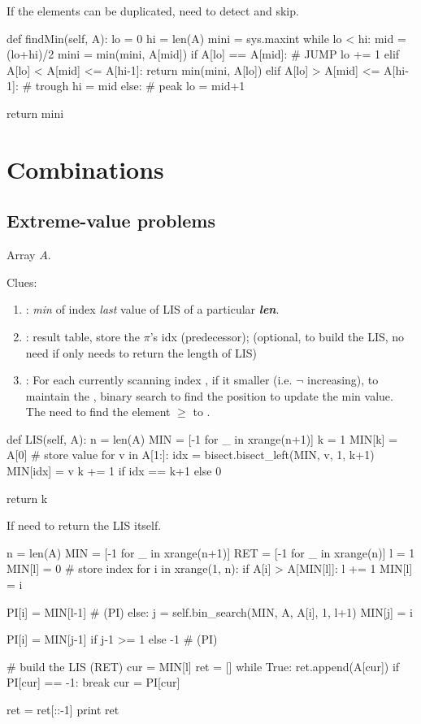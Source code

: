 If the elements can be duplicated, need to detect and skip. 
\begin{python}
def findMin(self, A):
    lo = 0
    hi = len(A)
    mini = sys.maxint
    while lo < hi:
        mid = (lo+hi)/2
        mini = min(mini, A[mid])
        if A[lo] == A[mid]:  # JUMP
            lo += 1
        elif A[lo] < A[mid] <= A[hi-1]:
            return min(mini, A[lo])
        elif A[lo] > A[mid] <= A[hi-1]:  # trough
            hi = mid
        else:  # peak
            lo = mid+1

    return mini
\end{python}
\section{Combinations}
\subsection{Extreme-value problems}\label{extremeValueProblem}
 Array $A$.

Clues:
\begin{enumerate}
\item {}: \textit{min} of index \textit{last} value of LIS of a particular \textit{\textbf{len}}.
\item {}: result table, store the $\pi$'s idx (predecessor); (optional, to build the LIS, no need if only needs to return the length of LIS)
\item {}: For each currently scanning index , if it smaller (i.e. $\neg$ increasing), to maintain the , binary search to find the position to update the min value. The  need to find the element $\geq$ to .
\end{enumerate}
\newpage
\begin{python}
def LIS(self, A):
    n = len(A)
    MIN = [-1 for _ in xrange(n+1)]
    k = 1
    MIN[k] = A[0]  # store value
    for v in A[1:]:
        idx = bisect.bisect_left(MIN, v, 1, k+1)
        MIN[idx] = v
        k += 1 if idx == k+1 else 0

    return k
\end{python}
If need to return the LIS itself. 
\begin{python}
    n = len(A)
    MIN = [-1 for _ in xrange(n+1)]
    RET = [-1 for _ in xrange(n)]
    l = 1
    MIN[l] = 0  # store index
    for i in xrange(1, n):
        if A[i] > A[MIN[l]]:
            l += 1
            MIN[l] = i

            PI[i] = MIN[l-1]  # (PI)
        else:
            j = self.bin_search(MIN, A, A[i], 1, l+1)
            MIN[j] = i

            PI[i] = MIN[j-1] if j-1 >= 1 else -1  # (PI)

    # build the LIS (RET)
    cur = MIN[l]
    ret = []
    while True:
        ret.append(A[cur])
        if PI[cur] == -1: break
        cur = PI[cur]

    ret = ret[::-1]
    print ret
\end{python}


